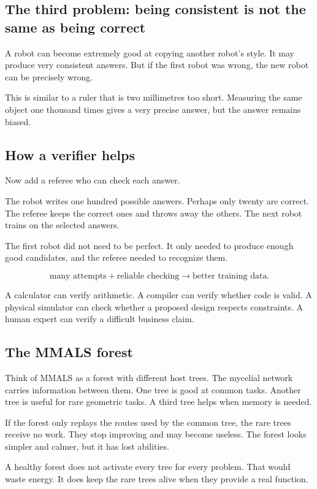\subsection{The third problem: being consistent is not the same as being correct}

A robot can become extremely good at copying another robot's style. It may produce very consistent answers. But if the first robot was wrong, the new robot can be precisely wrong.

This is similar to a ruler that is two millimetres too short. Measuring the same object one thousand times gives a very precise answer, but the answer remains biased.

\subsection{How a verifier helps}

Now add a referee who can check each answer.

The robot writes one hundred possible answers. Perhaps only twenty are correct. The referee keeps the correct ones and throws away the others. The next robot trains on the selected answers.

The first robot did not need to be perfect. It only needed to produce enough good candidates, and the referee needed to recognize them.

\[
\text{many attempts} + \text{reliable checking} \longrightarrow \text{better training data}.
\]

A calculator can verify arithmetic. A compiler can verify whether code is valid. A physical simulator can check whether a proposed design respects constraints. A human expert can verify a difficult business claim.

\subsection{The MMALS forest}

Think of MMALS as a forest with different host trees. The mycelial network carries information between them. One tree is good at common tasks. Another tree is useful for rare geometric tasks. A third tree helps when memory is needed.

If the forest only replays the routes used by the common tree, the rare trees receive no work. They stop improving and may become useless. The forest looks simpler and calmer, but it has lost abilities.

A healthy forest does not activate every tree for every problem. That would waste energy. It does keep the rare trees alive when they provide a real function.

